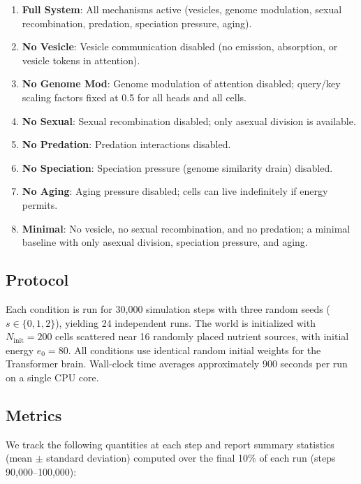 \documentclass[10pt,twocolumn]{article}
\begin{document}
\begin{enumerate}
  \item \textbf{Full System}: All mechanisms active (vesicles, genome modulation, sexual recombination, predation, speciation pressure, aging).
  \item \textbf{No Vesicle}: Vesicle communication disabled (no emission, absorption, or vesicle tokens in attention).
  \item \textbf{No Genome Mod}: Genome modulation of attention disabled; query/key scaling factors fixed at 0.5 for all heads and all cells.
  \item \textbf{No Sexual}: Sexual recombination disabled; only asexual division is available.
  \item \textbf{No Predation}: Predation interactions disabled.
  \item \textbf{No Speciation}: Speciation pressure (genome similarity drain) disabled.
  \item \textbf{No Aging}: Aging pressure disabled; cells can live indefinitely if energy permits.
  \item \textbf{Minimal}: No vesicle, no sexual recombination, and no predation; a minimal baseline with only asexual division, speciation pressure, and aging.
\end{enumerate}

\subsection{Protocol}

Each condition is run for 30{,}000 simulation steps with three random seeds ($s \in \{0, 1, 2\}$), yielding 24 independent runs.
The world is initialized with $N_{\text{init}} = 200$ cells scattered near 16 randomly placed nutrient sources, with initial energy $e_0 = 80$.
All conditions use identical random initial weights for the Transformer brain.
Wall-clock time averages approximately 900 seconds per run on a single CPU core.

\subsection{Metrics}

We track the following quantities at each step and report summary statistics (mean $\pm$ standard deviation) computed over the final 10\% of each run (steps 90{,}000--100{,}000):
\end{document}
